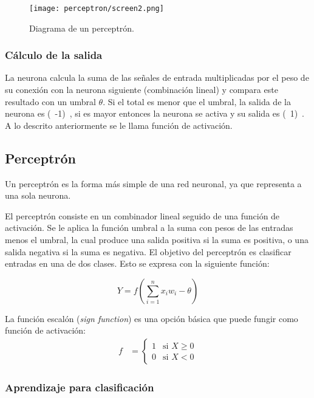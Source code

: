 \begin{figure}[ht]
  \centering
  \texttt{[image: perceptron/screen2.png]}
  \caption{Diagrama de un perceptrón. \parencite[168]{Nengnevitsky2005}}
  \label{fig:P9screen2}
\end{figure}

\subsubsection{Cálculo de la salida}

\noindent La neurona calcula la suma de las señales de entrada multiplicadas por el peso de su conexión con la neurona siguiente (combinación lineal) y compara este resultado con un umbral $\theta$. Si el total es menor que el umbral, la salida de la neurona es (\ -1)\ , si es mayor entonces la neurona se activa y su salida es (\ 1)\ . A lo descrito anteriormente se le llama función de activación.


\subsection{Perceptr\'on}

Un perceptrón es la forma más simple de una red neuronal, ya que representa a una sola neurona.

El perceptrón consiste en un combinador lineal seguido de una función de activación. Se le aplica la función umbral a la suma con pesos de las entradas menos el umbral, la cual produce una salida positiva si la suma es positiva, o una salida negativa si la suma es negativa. El objetivo del perceptrón es clasificar entradas en una de dos clases. Esto se expresa con la siguiente función: 

\[Y = f\left(\sum_{i=1}^{n}x_iw_i-\theta\right)\]
\parencite[169]{Nengnevitsky2005}

La función escalón (\textit{sign function}) es una opción básica que puede fungir como función de activación:
\begin{align*}
 f &= \begin{cases}
       1 & \text{si } X \geq 0 \\
       0 & \text{si } X < 0
      \end{cases}
\end{align*}

\subsubsection{Aprendizaje para clasificación}

